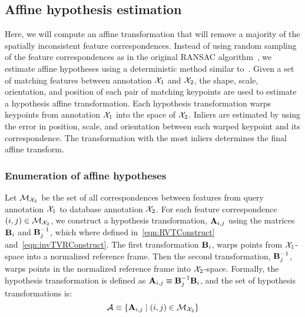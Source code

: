     \subsection{Affine hypothesis estimation}
        Here, we will compute an affine transformation that will remove
          a majority of the spatially inconsistent feature
          correspondences.
        Instead of using random sampling of the feature correspondences
          as in the original RANSAC
          algorithm~\cite{hartley_multiple_2003}, we estimate affine
          hypotheses using a deterministic method similar
          to~\cite{philbin_object_2007, chum_homography_2012}.
        Given a set of matching features between annotation $\mathcal{X}_{1}$
          and $\mathcal{X}_{2}$, the shape, scale, orientation, and position of
          each pair of matching keypoints are used to estimate a
          hypothesis affine transformation.
        Each hypothesis transformation warps keypoints from annotation
          $\mathcal{X}_{1}$ into the space of $\mathcal{X}_{2}$.
        Inliers are estimated by using the error in position, scale,
          and orientation between each warped keypoint and its
          correspondence.
        The transformation with the most inliers determines the final
          affine transform.

        \newcommand{\AffMat}{\mat{A}}
        \newcommand{\HypothSet}{\set{A}}
        \newcommand{\AffMatij}{\mat{A}_{i, j}}
        \newcommand{\HypothAffMat}{\hat{\mat{A}}}

        \subsubsection{Enumeration of affine hypotheses}
            Let $\mathcal{M}_{\mathcal{X}_{2}}$ be the set of all correspondences
              between features from query annotation $\mathcal{X}_{1}$ to
              database annotation $\mathcal{X}_{2}$.
            For each feature correspondence $(i, j) \in
              \mathcal{M}_{\mathcal{X}_{2}}$, we construct a hypothesis
              transformation, $\AffMatij$ using the matrices $\mathbf{B}_{i}$
              and $\mathbf{B}_{j}^{-1}$, which where defined
              in~\cref{eqn:RVTConstruct} and~\cref{eqn:invTVRConstruct}.
            The first transformation $\mathbf{B}_{i}$, warps points from
              $\mathcal{X}_{1}$-space into a normalized reference frame.
            Then the second transformation, $\mathbf{B}_{j}^{-1}$, warps
              points in the normalized reference frame into
              $\mathcal{X}_{2}$-space.
            Formally, the hypothesis transformation is defined as
              $\AffMatij \eqv \inv{\rvmat_{j}}\rvmat_{i}$, and the set of
              hypothesis transformations is:
            \begin{equation}
                \HypothSet \eqv \curly{ \AffMatij \where (i, j) \in \Matches_{\annotII} }
            \end{equation}

